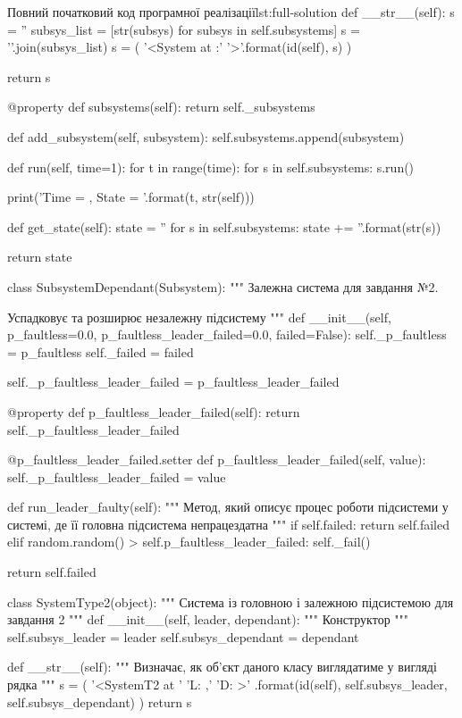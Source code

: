 \documentclass[
	a4paper,
	oneside,
	BCOR = 10mm,
	DIV = 12,
	12pt,
	headings = normal,
]{scrartcl}
\begin{document}
\begin{listingpython}[toprule = 0pt, bottomrule = 0pt]{Повний початковий код програмної реалізації}{lst:full-solution}
    def __str__(self):
        s = ''
        subsys_list = [str(subsys) for subsys in self.subsystems]
        s = '\n'.join(subsys_list)
        s = (
            '<System at {}:\n'
            '{}>'.format(id(self), s)
        )

        return s

    @property
    def subsystems(self):
        return self._subsystems

    def add_subsystem(self, subsystem):
        self.subsystems.append(subsystem)

    def run(self, time=1):
        for t in range(time):
            for s in self.subsystems:
                s.run()

            print('Time = {}, State = {}\n'.format(t, str(self)))

    def get_state(self):
        state = ''
        for s in self.subsystems:
            state += ''.format(str(s))

        return state


class SubsystemDependant(Subsystem):
    """ Залежна система для завдання №2.

    Успадковує та розширює незалежну підсистему
    """
    def __init__(self, p_faultless=0.0, p_faultless_leader_failed=0.0,
                 failed=False):
        self._p_faultless = p_faultless
        self._failed = failed

        self._p_faultless_leader_failed = p_faultless_leader_failed

    @property
    def p_faultless_leader_failed(self):
        return self._p_faultless_leader_failed

    @p_faultless_leader_failed.setter
    def p_faultless_leader_failed(self, value):
        self._p_faultless_leader_failed = value

    def run_leader_faulty(self):
        """ Метод, який описує процес роботи підсистеми у системі, де її головна
        підсистема непрацездатна
        """
        if self.failed:
            return self.failed
        elif random.random() > self.p_faultless_leader_failed:
            self._fail()

        return self.failed


class SystemType2(object):
    """ Система із головною і залежною підсистемою для
    завдання 2
    """
    def __init__(self, leader, dependant):
        """ Конструктор
        """
        self.subsys_leader = leader
        self.subsys_dependant = dependant

    def __str__(self):
        """ Визначає, як об'єкт даного класу виглядатиме у вигляді рядка
        """
        s = (
            '<SystemT2 at {}\n'
            'L: {},\n'
            'D: {}>'
            .format(id(self), self.subsys_leader, self.subsys_dependant)
        )
        return s


\end{listingpython}
\end{document}
